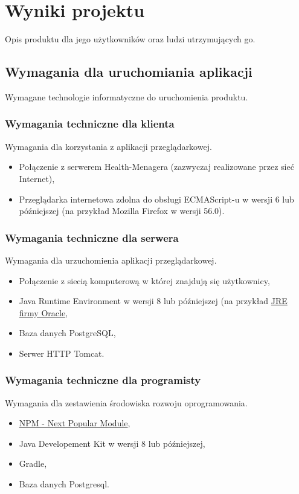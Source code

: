\documentclass[polish,12pt]{aghthesis}
\begin{document}
\section{Wyniki projektu}
\label{sec:wyniki-projektu}

Opis produktu dla jego użytkowników oraz ludzi utrzymujących go.

\subsection{Wymagania dla uruchomiania aplikacji}
Wymagane technologie informatyczne do uruchomienia produktu.
\subsubsection{Wymagania techniczne dla klienta}
Wymagania dla korzystania z aplikacji przeglądarkowej.
\begin{itemize}
  \item  Połączenie z serwerem Health-Menagera (zazwyczaj realizowane przez sieć Internet),
  \item Przeglądarka internetowa zdolna do obsługi ECMAScript-u w wersji 6 lub późniejszej (na przykład Mozilla Firefox w wersji 56.0).
\end{itemize}

\subsubsection{Wymagania techniczne dla serwera}
Wymagania dla urzuchomienia aplikacji przeglądarkowej.
\begin{itemize}
    \item Połączenie z siecią komputerową w której znajdują się użytkownicy,
    \item Java Runtime Environment w wersji 8 lub późniejszej (na przykład \href{https://www.java.com/pl/download/manual.jsp}{JRE firmy Oracle},
    \item Baza danych PostgreSQL,
    \item Serwer HTTP Tomcat.
\end{itemize}

\subsubsection{Wymagania techniczne dla programisty}
Wymagania dla zestawienia środowiska rozwoju oprogramowania.
\begin{itemize}
    \item \href{https://www.npmjs.com/}{NPM - Next Popular Module},
    \item Java Developement Kit w wersji 8 lub późniejszej,
    \item Gradle,
    \item Baza danych Postgresql.
\end{itemize}
\end{document}
